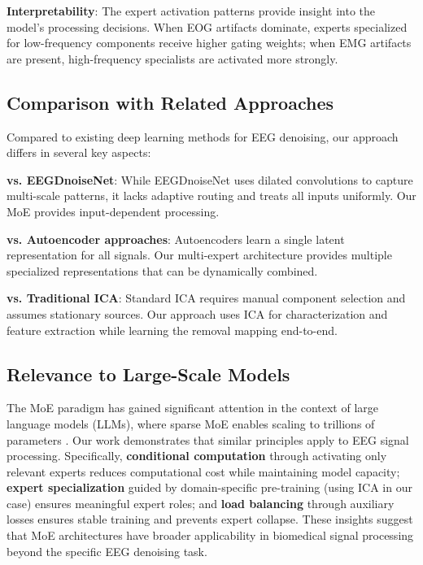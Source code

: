 \documentclass{article}
\begin{document}
\textbf{Interpretability}: The expert activation patterns provide insight into the model's processing decisions. When EOG artifacts dominate, experts specialized for low-frequency components receive higher gating weights; when EMG artifacts are present, high-frequency specialists are activated more strongly.

\subsection{Comparison with Related Approaches}

Compared to existing deep learning methods for EEG denoising, our approach differs in several key aspects:

\textbf{vs. EEGDnoiseNet}: While EEGDnoiseNet uses dilated convolutions to capture multi-scale patterns, it lacks adaptive routing and treats all inputs uniformly. Our MoE provides input-dependent processing.

\textbf{vs. Autoencoder approaches}: Autoencoders learn a single latent representation for all signals. Our multi-expert architecture provides multiple specialized representations that can be dynamically combined.

\textbf{vs. Traditional ICA}: Standard ICA requires manual component selection and assumes stationary sources. Our approach uses ICA for characterization and feature extraction while learning the removal mapping end-to-end.

\subsection{Relevance to Large-Scale Models}

The MoE paradigm has gained significant attention in the context of large language models (LLMs), where sparse MoE enables scaling to trillions of parameters \cite{fedus2022switch, jiang2024mixtral}. Our work demonstrates that similar principles apply to EEG signal processing. Specifically, \textbf{conditional computation} through activating only relevant experts reduces computational cost while maintaining model capacity; \textbf{expert specialization} guided by domain-specific pre-training (using ICA in our case) ensures meaningful expert roles; and \textbf{load balancing} through auxiliary losses ensures stable training and prevents expert collapse. These insights suggest that MoE architectures have broader applicability in biomedical signal processing beyond the specific EEG denoising task.
\end{document}
